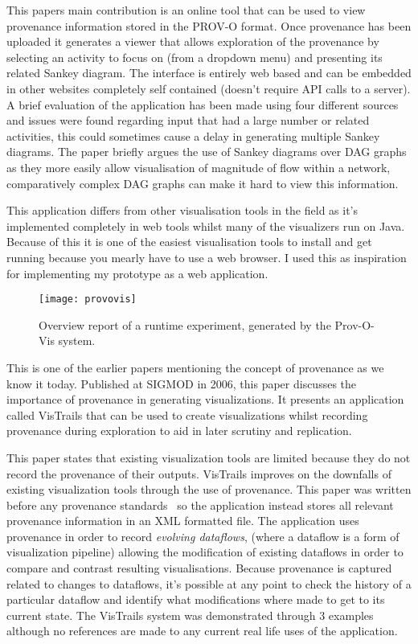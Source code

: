 This papers main contribution is an online tool that can be used to view provenance information stored in the PROV-O format. Once provenance has been uploaded it generates a viewer that allows exploration of the provenance by selecting an activity to focus on (from a dropdown menu) and presenting its related Sankey diagram. The interface is entirely web based and can be embedded in other websites completely self contained (doesn't require API calls to a server). A brief evaluation of the application has been made using four different sources and issues were found regarding input that had a large number or related activities, this could sometimes cause a delay in generating multiple Sankey diagrams. The paper briefly argues the use of Sankey diagrams over DAG graphs as they more easily allow visualisation of magnitude of flow within a network, comparatively complex DAG graphs can make it hard to view this information.

This application differs from other visualisation tools in the field as it's implemented completely in web tools whilst many of the visualizers run on Java. Because of this it is one of the easiest visualisation tools to install and get running because you mearly have to use a web browser. I used this as inspiration for implementing my prototype as a web application. 

\begin{figure}[h]
	\centering
	\texttt{[image: provovis]}
\caption{Overview report of a runtime experiment, generated by the Prov-O-Vis system.}
	\label{fig:provovis}
\end{figure}

This is one of the earlier papers mentioning the concept of provenance as we know it today. Published at SIGMOD in 2006, this paper discusses the importance of provenance in generating visualizations. It presents an application called VisTrails that can be used to create visualizations whilst recording provenance during exploration to aid in later scrutiny and replication.

This paper states that existing visualization tools are limited because they do not record the provenance of their outputs. VisTrails improves on the downfalls of existing visualization tools through the use of provenance. This paper was written before any provenance standards~\cite{Macko2012} so the application instead stores all relevant provenance information in an XML formatted file. The application uses provenance in order to record \textit{evolving dataflows}, (where a dataflow is a form of visualization pipeline) allowing the modification of existing dataflows in order to compare and contrast resulting visualisations. Because provenance is captured related to changes to dataflows, it's possible at any point to check the history of a particular dataflow and identify what modifications where made to get to its current state. The VisTrails system was demonstrated through 3 examples although no references are made to any current real life uses of the application.

